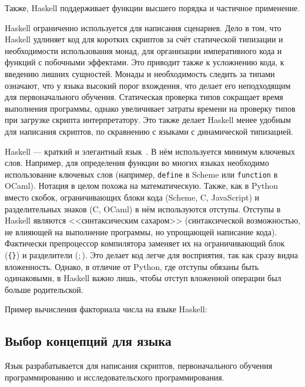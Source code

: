         Также, Haskell поддерживает функции высшего порядка и частичное применение.

        Haskell ограниченно используется для написания сценариев.
        Дело в том, что Haskell удлиняет код для коротких скриптов за счёт статической типизации и необходимости использования монад, для организации императивного кода и функций с побочными эффектами.
        Это приводит также к усложнению кода, к введению лишних сущностей.
        Монады и необходимость следить за типами означают, что у языка высокий порог вхождения, что делает его неподходящим для первоначального обучения.
        Статическая проверка типов сокращает время выполнения программы, однако увеличивает затраты времени на проверку типов при загрузке скрипта интерпретатору.
        Это также делает Haskell менее удобным для написания скриптов, по скравнению с языками с динамической типизацией.

        Haskell --- краткий и элегантный язык~\cite{haskell}.
        В нём используется минимум ключевых слов.
        Например, для определения функции во многих языках необходимо использование ключевых слов (например, \verb!define! в Scheme или \verb!function! в OCaml).
        Нотация в целом похожа на математическую.
        Также, как в Python вместо скобок, ограничивающих блоки кода (Scheme, C, JavaScript) и разделительных знаков (C, OCaml) в нём используются отступы.
        Отступы в Haskell являются <<синтаксическим сахаром>> (синтаксической возможностью, не влияющей на выполнение программы, но упрощающей написание кода).
        Фактически препроцессор компилятора заменяет их на ограничивающий блок (\verb${}$) и разделители ($;$).
        Это делает код легче для восприятия, так как сразу видна вложенность.
        Однако, в отличие от Python, где отступы обязаны быть одинаковыми, в Haskell важно лишь, чтобы отступ вложенной операции был больше родительской.

        Пример вычисления факториала числа на языке Haskell:

        

    \subsection{Выбор концепций для языка}
        Язык разрабатывается для написания скриптов, первоначального обучения программированию и исследовательского программирования.

